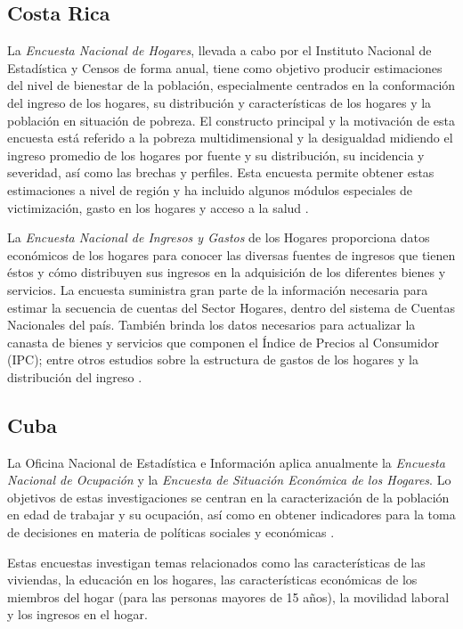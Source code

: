 \hypertarget{costa-rica}{%
\subsection*{Costa Rica}\label{costa-rica}}


La \emph{Encuesta Nacional de Hogares}, llevada a cabo por el Instituto Nacional de Estadística y Censos de forma anual, tiene como objetivo producir estimaciones del nivel de bienestar de la población, especialmente centrados en la conformación del ingreso de los hogares, su distribución y características de los hogares y la población en situación de pobreza. El constructo principal y la motivación de esta encuesta está referido a la pobreza multidimensional y la desigualdad midiendo el ingreso promedio de los hogares por fuente y su distribución, su incidencia y severidad, así como las brechas y perfiles. Esta encuesta permite obtener estas estimaciones a nivel de región y ha incluido algunos módulos especiales de victimización, gasto en los hogares y acceso a la salud \citep{INEC-CR_2017}.

La \emph{Encuesta Nacional de Ingresos y Gastos} de los Hogares proporciona datos económicos de los hogares para conocer las diversas fuentes de ingresos que tienen éstos y cómo distribuyen sus ingresos en la adquisición de los diferentes bienes y servicios. La encuesta suministra gran parte de la información necesaria para estimar la secuencia de cuentas del Sector Hogares, dentro del sistema de Cuentas Nacionales del país. También brinda los datos necesarios para actualizar la canasta de bienes y servicios que componen el Índice de Precios al Consumidor (IPC); entre otros estudios sobre la estructura de gastos de los hogares y la distribución del ingreso \citep{INEC-CR_2018}.

\hypertarget{cuba}{%
\subsection*{Cuba}\label{cuba}}


La Oficina Nacional de Estadística e Información aplica anualmente la \emph{Encuesta Nacional de Ocupación} y la \emph{Encuesta de Situación Económica de los Hogares}. Lo objetivos de estas investigaciones se centran en la caracterización de la población en edad de trabajar y su ocupación, así como en obtener indicadores para la toma de decisiones en materia de políticas sociales y económicas \citep{ONE-CU}.

Estas encuestas investigan temas relacionados como las características de las viviendas, la educación en los hogares, las características económicas de los miembros del hogar (para las personas mayores de 15 años), la movilidad laboral y los ingresos en el hogar.

